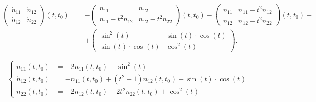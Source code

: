 \begin{solution}
    \begin{align*}
        \begin{pmatrix} \dot n_{11} & \dot n_{12} \\ \dot n_{12} & \dot n_{22} \end{pmatrix} (t, t_0) = &- \begin{pmatrix} n_{11} & n_{12} \\ n_{11} - t^2n_{12} & n_{12} - t^2n_{22} \end{pmatrix} (t, t_0) - \begin{pmatrix} n_{11} & n_{11} - t^2n_{12} \\ n_{12} & n_{12} - t^2n_{22} \end{pmatrix}(t, t_0) + \\
        &+ \begin{pmatrix} \sin^2(t) & \sin(t)\cdot \cos(t) \\ \sin(t) \cdot \cos(t) & \cos^2(t) \end{pmatrix}.
    \end{align*} 
    
    \begin{equation*}
        \left\{
            \begin{aligned}
                \dot n_{11} (t, t_0) &= - 2n_{11} (t, t_0) + \sin^2(t) \\
                \dot n_{12} (t, t_0) &= - n_{11} (t, t_0) + (t^2 - 1) n_{12} (t, t_0) + \sin(t)\cdot \cos(t) \\
                \dot n_{22} (t, t_0) &= - 2n_{12} (t, t_0) + 2t^2 n_{22} (t, t_0) + \cos^2(t)
            \end{aligned}
        \right.
    \end{equation*}
\end{solution}

